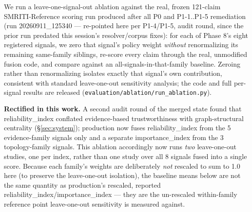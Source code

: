 We run a leave-one-signal-out ablation against the real, frozen
121-claim SMRITI-Reference scoring run produced after all P0 and
P1-1..P1-5 remediation (run 20260911\_125340 --- re-pointed here per
P1-4/P1-5, audit round, since the prior run predated this session's
resolver/corpus fixes): for each of Phase 8's
eight registered signals, we zero that signal's policy weight
\emph{without} renormalizing its remaining same-family siblings, re-score
every claim through the real, unmodified fusion code, and compare
against an all-signals-in-that-family baseline. Zeroing rather than
renormalizing isolates exactly that signal's own contribution, consistent
with standard leave-one-out sensitivity analysis; the code and full
per-signal results are released
(\texttt{evaluation/ablation/run\_ablation.py}).

\textbf{Rectified in this work.} A second audit round of the
merged state found that reliability\_index conflated evidence-based
trustworthiness with graph-structural centrality (\S\ref{sec:system});
production now fuses reliability\_index from the 5 evidence-family
signals only and a separate importance\_index from the 3 topology-family
signals. This ablation accordingly now runs \emph{two} leave-one-out
studies, one per index, rather than one study over all 8 signals fused
into a single score. Because each family's weights are deliberately
\emph{not} rescaled to sum to 1.0 here (to preserve the leave-one-out
isolation), the baseline means below are not the same quantity as
production's rescaled, reported reliability\_index/importance\_index ---
they are the un-rescaled within-family reference point leave-one-out
sensitivity is measured against.



